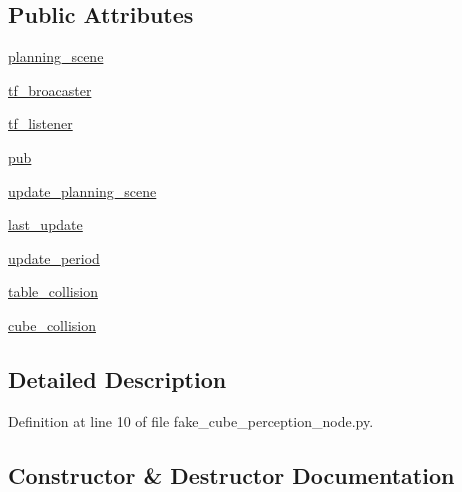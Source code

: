 \subsection*{Public Attributes}
\begin{DoxyCompactItemize}
\item 
\hyperlink{classfake__cube__perception__node_1_1FakePerceptionNode_a9385fd4c339eeaf1ca269ef9e314bb09}{planning\+\_\+scene}
\item 
\hyperlink{classfake__cube__perception__node_1_1FakePerceptionNode_a6f4046762e6ee49202366e4df6a2a60c}{tf\+\_\+broacaster}
\item 
\hyperlink{classfake__cube__perception__node_1_1FakePerceptionNode_a8e6364816c392f5118ad16c794adc142}{tf\+\_\+listener}
\item 
\hyperlink{classfake__cube__perception__node_1_1FakePerceptionNode_a6e2d7e3ce4c1808f5bf033293a2d511d}{pub}
\item 
\hyperlink{classfake__cube__perception__node_1_1FakePerceptionNode_a67b87c9f077aefedf69f3e6d9b29ea94}{update\+\_\+planning\+\_\+scene}
\item 
\hyperlink{classfake__cube__perception__node_1_1FakePerceptionNode_a2f5f0b4e0a1483187b2a84552df7edc1}{last\+\_\+update}
\item 
\hyperlink{classfake__cube__perception__node_1_1FakePerceptionNode_a3df1532cfe1c0b4ed99346a498150c73}{update\+\_\+period}
\item 
\hyperlink{classfake__cube__perception__node_1_1FakePerceptionNode_a47eafffe4962f50c353a0a2adb9e71be}{table\+\_\+collision}
\item 
\hyperlink{classfake__cube__perception__node_1_1FakePerceptionNode_a5af28c647aa93cf6bb90d4228e27667f}{cube\+\_\+collision}
\end{DoxyCompactItemize}


\subsection{Detailed Description}


Definition at line 10 of file fake\+\_\+cube\+\_\+perception\+\_\+node.\+py.



\subsection{Constructor \& Destructor Documentation}
